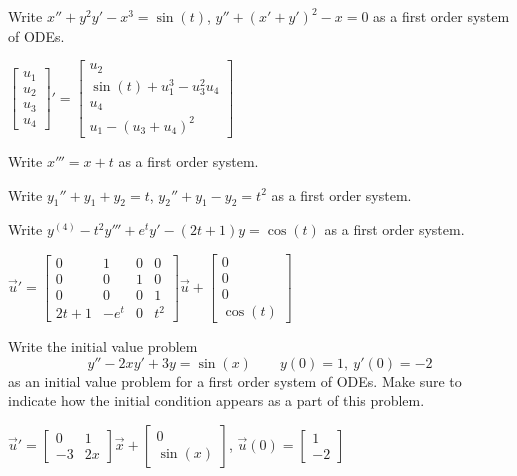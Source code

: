 \begin{exercise}
Write $x'' + y^2 y' - x^3 = \sin(t)$, 
$y'' + {(x'+y')}^2 -x = 0$ as a first order system of ODEs.
\end{exercise}
\comboSol{%
}
{%
$\left[\begin{smallmatrix} u_1 \\ u_2 \\ u_3 \\ u_4 \end{smallmatrix}\right]' = \left[\begin{smallmatrix} u_2 \\ \sin(t) + u_1^3 - u_3^2u_4 \\ u_4 \\ u_1 - (u_3 + u_4)^2 \end{smallmatrix}\right]$
}

\begin{exercise}\ansMark%
Write $x''' = x+t$ as a first order system.
\end{exercise}

\begin{exercise}\ansMark%
Write $y_1'' + y_1 + y_2 = t$, 
$y_2'' + y_1 - y_2 = t^2$ as a first order system.
\end{exercise}

\begin{exercise}
Write $y^{(4)} - t^2 y''' + e^t y' - (2t+1)y = \cos(t)$ as a first order system.
\end{exercise}
\comboSol{%
}
{%
$\vec{u}' = \left[\begin{smallmatrix}  0 & 1 & 0 & 0 \\ 0 & 0 & 1 & 0 \\ 0 & 0 & 0 & 1 \\ 2t+1 & -e^t & 0 & t^2 \end{smallmatrix}\right]\vec{u} + \left[\begin{smallmatrix} 0 \\ 0 \\ 0 \\ \cos(t) \end{smallmatrix}\right]$
}

\begin{exercise}
Write the initial value problem 
\[ y'' - 2xy' + 3y = \sin(x) \qquad y(0) = 1,\ y'(0) = -2 \] as an initial value problem for a first order system of ODEs. Make sure to indicate how the initial condition appears as a part of this problem. 
\end{exercise}
\comboSol{%
}
{%
$\vec{u}' = \left[\begin{smallmatrix}  0 & 1 \\ -3 & 2x \end{smallmatrix}\right]\vec{x} + \left[\begin{smallmatrix}  0 \\ \sin(x) \end{smallmatrix}\right]$, $\vec{u}(0) = \left[\begin{smallmatrix}  1 \\ -2 \end{smallmatrix}\right]$
}

